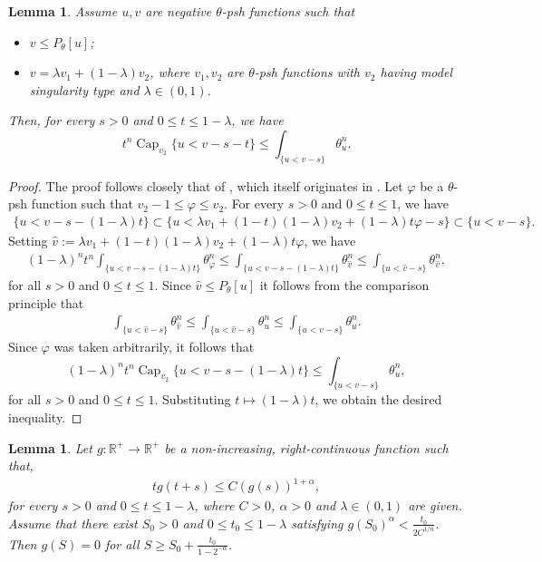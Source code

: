 \documentclass[a4paper,11pt]{amsart}
\numberwithin{equation}{section}
\newtheorem{lemma}[theorem]{Lemma}
\theoremstyle{definition}
\newcommand{\capacity}{\mathop{\mathrm{Cap}}\nolimits}
\newcommand{\R}{\mathbb{R}}
\begin{document}
\begin{lemma}\label{lem t^n cap}
	Assume $u, v$ are negative $\theta$-psh functions such that
	\begin{itemize}
		\item $v\leq P_{\theta}[u]$;
		\item $v=\lambda v_1+(1-\lambda) v_2$, where  $v_1, v_2$ are $\theta$-psh functions
		with $v_2$ having model singularity type and $\lambda\in (0, 1)$. 
	\end{itemize}
Then, for every $s>0$ and $0\leq t\leq 1-\lambda$, we have
	$$t^n \capacity_{v_2}\{u<v-s- t\}\leq \int_{\{u<v-s\}}\theta_u^n.$$
\end{lemma}
\begin{proof} The proof follows closely that of \cite[Lemma 4.31]{darvas2018monotonicity}, which itself originates in \cite[Lemma 4.2]{boucksom2010monge}.
	 Let $\varphi$ be a $\theta$-psh function such that $v_2-1\leq\varphi\leq v_2$. For every
	 $s>0$ and $0\leq t\leq 1$, we have
	 \begin{align*}
	 	\{u<v-s-(1-\lambda) t\}\subset \{u< \lambda v_1+(1-t)(1-\lambda) v_2+(1-\lambda) t\varphi-s \}
	 	 \subset \{u<v-s\}.
	 \end{align*}
 Setting $\widehat{v}:=\lambda v_1+(1-t)(1-\lambda) v_2+(1-\lambda) t\varphi$, we have
 \begin{align*}
 	(1-\lambda)^nt^n\int_{\{u<v-s-(1-\lambda) t\}}\theta_{\varphi}^n
 	\leq \int_{\{u<v-s-(1-\lambda) t\}}\theta_{\widehat{v}}^n
 	\leq \int_{\{u<\widehat{v}-s\}}\theta_{\widehat{v}}^n,
 \end{align*}
for all $s>0$ and $0\leq t\leq 1$. Since $\widehat{v}\leq P_\theta[u]$
it follows from the comparison principle
 \cite[Lemma 2.3]{darvas2021log} that 
 \begin{align*}
   \int_{\{u<\widehat{v}-s\}}\theta_{\widehat{v}}^n  \leq \int_{\{u<\widehat{v}-s\}}\theta_{u}^n
 	\leq \int_{\{u<v-s\}}\theta_{u}^n.
 \end{align*}
 Since $\varphi$ was taken arbitrarily, it follows that
 	$$(1-\lambda)^nt^n \capacity_{v_2}\{u<v-s-(1-\lambda) t\}\leq \int_{\{u<v-s\}}\theta_u^n,$$
for all $s>0$ and $0\leq t\leq 1$. Substituting $t\mapsto (1-\lambda) t$, we obtain the desired inequality.
\end{proof}
\begin{lemma}\label{lem tg(t+s)}
	Let $g: \R^+\rightarrow\R^+$ be a non-increasing, right-continuous function such that, 
	\begin{align*}
		tg(t+s)\leq C(g(s))^{1+\alpha},
	\end{align*}
for every $s>0$ and $0\leq t\leq 1-\lambda$, where $C>0$, $\alpha> 0$ and $\lambda\in (0, 1)$ are given.
Assume that there exist $S_0>0$ and $0\leq t_0\leq 1-\lambda$ satisfying $g(S_0)^{\alpha}<\frac{t_0}{2C^{1/n}}$.
Then $g\left(S\right)=0$ for all $S\geq S_0+\frac{t_0}{1-2^{-\alpha}}$.
\end{lemma}
\end{document}
